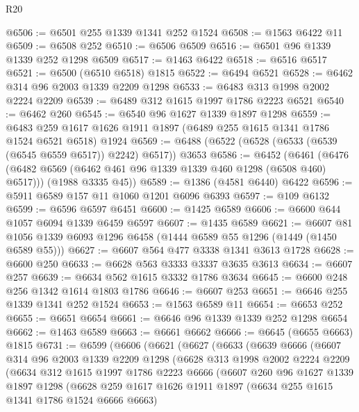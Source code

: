 \begin{lexlean}{R20}
\begin{coremodule}
@6506 := @6501 @255 @1339 @1341 @252 @1524
@6508 := @1563 @6422 @11
@6509 := @6508 @252
@6510 := @6506 @6509
@6516 := @6501 @96 @1339 @1339 @252 @1298 @6509
@6517 := @1463 @6422
@6518 := @6516 @6517
@6521 := @6500 (@6510 @6518) @1815
@6522 := @6494 @6521
@6528 := @6462 @314 @96 @2003 @1339 @2209 @1298
@6533 := @6483 @313 @1998 @2002 @2224 @2209
@6539 := @6489 @312 @1615 @1997 @1786 @2223 @6521
@6540 := @6462 @260
@6545 := @6540 @96 @1627 @1339 @1897 @1298
@6559 := @6483 @259 @1617 @1626 @1911 @1897 (@6489 @255 @1615 @1341 @1786 @1524 @6521 @6518) @1924
@6569 := @6488 (@6522 (@6528 (@6533 (@6539 (@6545 @6559 @6517)) @2242) @6517)) @3653
@6586 := @6452
    (@6461
      (@6476 (@6482 @6569 (@6462 @461 @96 @1339 @1339 @460 @1298 (@6508 @460) @6517)))
      (@1988 @3335 @45))
@6589 := @1386 (@4581 @6440) @6422
@6596 := @5911 @6589 @157 @11 @1060 @1201 @6096 @6393
@6597 := @109 @6132
@6599 := @6596 @6597 @6451
@6600 := @1425 @6589
@6606 := @6600 @644 @1057 @6094 @1339 @6459 @6597
@6607 := @1435 @6589
@6621 := @6607 @81 @1056 @1339 @6093 @1296 @6458 (@1444 @6589 @55 @1296 (@1449 (@1450 @6589 @55)))
@6627 := @6607 @564 @477 @3338 @1341 @3613 @1728
@6628 := @6600 @250
@6633 := @6628 @563 @3333 @3337 @3635 @3613
@6634 := @6607 @257
@6639 := @6634 @562 @1615 @3332 @1786 @3634
@6645 := @6600 @248 @256 @1342 @1614 @1803 @1786
@6646 := @6607 @253
@6651 := @6646 @255 @1339 @1341 @252 @1524
@6653 := @1563 @6589 @11
@6654 := @6653 @252
@6655 := @6651 @6654
@6661 := @6646 @96 @1339 @1339 @252 @1298 @6654
@6662 := @1463 @6589
@6663 := @6661 @6662
@6666 := @6645 (@6655 @6663) @1815
@6731 := @6599
    (@6606
      (@6621
        (@6627
          (@6633
            (@6639
              @6666
              (@6607
                @314
                @96
                @2003
                @1339
                @2209
                @1298
                (@6628
                  @313
                  @1998
                  @2002
                  @2224
                  @2209
                  (@6634
                    @312
                    @1615
                    @1997
                    @1786
                    @2223
                    @6666
                    (@6607
                      @260
                      @96
                      @1627
                      @1339
                      @1897
                      @1298
                      (@6628
                        @259
                        @1617
                        @1626
                        @1911
                        @1897
                        (@6634 @255 @1615 @1341 @1786 @1524 @6666 @6663)

\end{coremodule}
\end{lexlean}
